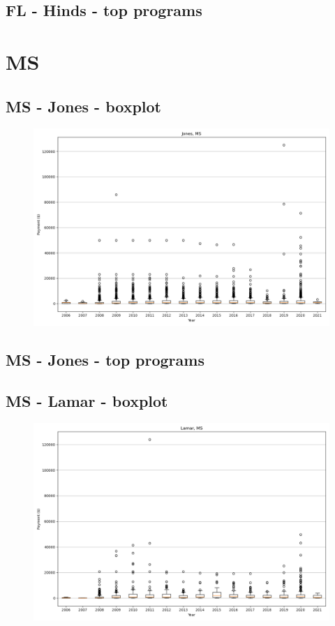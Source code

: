 \subsection*{FL - Hinds - top programs}

\newpage
\section*{MS}
\subsection*{MS - Jones - boxplot}
\begin{figure}[h]
\centering
\includegraphics[width=7in]{../output/boxplots/counties/Jones-MS_boxplot.png}
\end{figure}


\subsection*{MS - Jones - top programs}

\newpage
\subsection*{MS - Lamar - boxplot}
\begin{figure}[h]
\centering
\includegraphics[width=7in]{../output/boxplots/counties/Lamar-MS_boxplot.png}
\end{figure}


